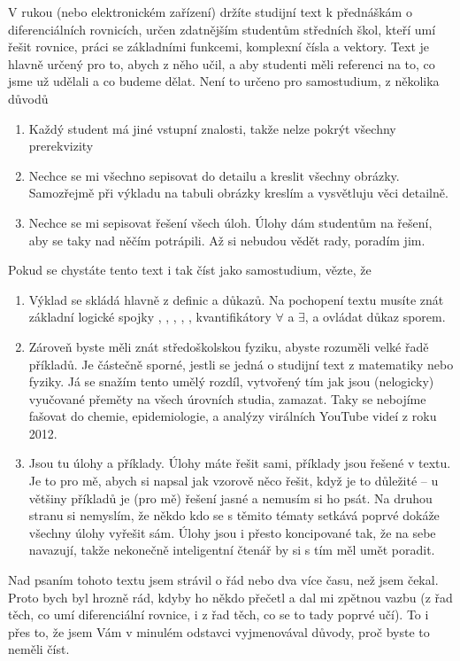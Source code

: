 
V rukou (nebo elektronickém zařízení) držíte studijní text k přednáškám o diferenciálních rovnicích, určen zdatnějším studentům středních škol, kteří umí řešit rovnice, práci se základními funkcemi, komplexní čísla a vektory. Text je hlavně určený pro to, abych z něho učil, a aby studenti měli referenci na to, co jsme už udělali a co budeme dělat. Není to určeno pro samostudium, z několika důvodů
\begin{enumerate}
	\item Každý student má jiné vstupní znalosti, takže nelze pokrýt všechny prerekvizity
	\item Nechce se mi všechno sepisovat do detailu a kreslit všechny obrázky. Samozřejmě při výkladu na tabuli obrázky kreslím a vysvětluju věci detailně.
	\item Nechce se mi sepisovat řešení všech úloh. Úlohy dám studentům na řešení, aby se taky nad něčím potrápili. Až si nebudou vědět rady, poradím jim.
\end{enumerate}
Pokud se chystáte tento text i tak číst jako samostudium, vězte, že
\begin{enumerate}
	\item Výklad se skládá hlavně z definic a důkazů. Na pochopení textu musíte znát základní logické spojky , , , , , kvantifikátory $\forall$ a $\exists$, a ovládat důkaz sporem.
	\item Zároveň byste měli znát středoškolskou fyziku, abyste rozuměli velké řadě příkladů. Je částečně sporné, jestli se jedná o studijní text z matematiky nebo fyziky. Já se snažím tento umělý rozdíl, vytvořený tím jak jsou (nelogicky) vyučované přeměty na všech úrovních studia, zamazat. Taky se nebojíme fašovat do chemie, epidemiologie, a analýzy virálních YouTube videí z roku 2012.
	\item Jsou tu úlohy a příklady. Úlohy máte řešit sami, příklady jsou řešené v textu. Je to pro mě, abych si napsal jak vzorově něco řešit, když je to důležité -- u většiny příkladů je (pro mě) řešení jasné a nemusím si ho psát. Na druhou stranu si nemyslím, že někdo kdo se s těmito tématy setkává poprvé dokáže všechny úlohy vyřešit sám. Úlohy jsou i přesto koncipované tak, že na sebe navazují, takže nekonečně inteligentní čtenář by si s tím měl umět poradit.
\end{enumerate}
Nad psaním tohoto textu jsem strávil o řád nebo dva více času, než jsem čekal. Proto bych byl hrozně rád, kdyby ho někdo přečetl a dal mi zpětnou vazbu (z řad těch, co umí diferenciální rovnice, i z řad těch, co se to tady poprvé učí). To i přes to, že jsem Vám v minulém odstavci vyjmenovával důvody, proč byste to neměli číst.

